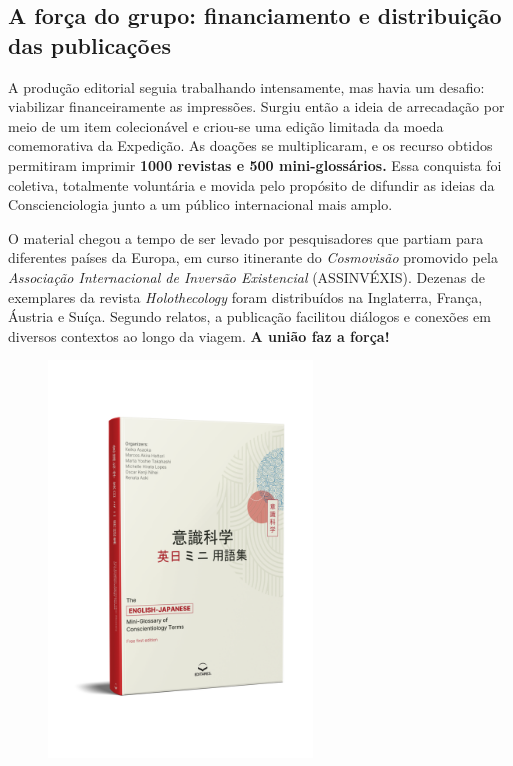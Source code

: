 \documentclass{gescons}
\begin{document}
\subsection*{A força do grupo: financiamento e distribuição das publicações}


A produção editorial seguia trabalhando intensamente, mas havia um desafio: viabilizar financeiramente as impressões. Surgiu então a ideia de arrecadação por meio de um item colecionável e criou-se uma edição limitada da moeda comemorativa da Expedição. As doações se multiplicaram, e os recurso obtidos permitiram imprimir \textbf{1000 revistas e 500 mini-glossários.} Essa conquista foi coletiva, totalmente voluntária e movida pelo propósito de difundir as ideias da Conscienciologia junto a um público internacional mais amplo.

O material chegou a tempo de ser levado por pesquisadores que partiam para diferentes países da Europa, em curso itinerante do \emph{Cosmovisão} promovido pela \emph{Associação Internacional de Inversão Existencial} (ASSINVÉXIS). Dezenas de exemplares da revista \emph{Holothecology} foram distribuídos na Inglaterra, França, Áustria e Suíça. Segundo relatos, a publicação facilitou diálogos e conexões em diversos contextos ao longo da viagem. \textbf{A união faz a força!}

\begin{figure}
  \vspace{-15mm}\hspace{-8mm}\includegraphics[width=7cm]{articles/entrevista/mockups/Mini-Glossary.png}
\end{figure}
\end{document}

